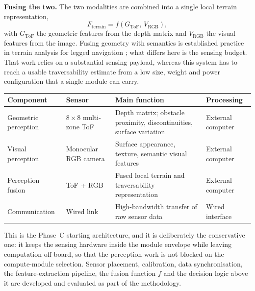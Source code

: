 \documentclass[11pt,a4paper]{article}
\newif\ifreview
\newcommand{\pending}[1]{\ifreview{\color{blue}#1}\else#1\fi}
\newenvironment{pblock}{\ifreview\color{blue}\fi}{}
\newcounter{gsec}
\newcounter{gsub}
\newcommand{\curgsec}{}
\newcommand{\gsep}{\texorpdfstring{\quad}{ }}
\newcommand{\gtocsub}[2]{%
  \phantomsection
  \addcontentsline{toc}{subsection}{#1\gsep #2}%
}
\newcommand{\gsubsection}[1]{%
  \refstepcounter{gsub}%
  \edef\gsublbl{\curgsec.\thegsub}%
  \expandafter\gtocsub\expandafter{\gsublbl}{#1}%
  \subsection*{\gsublbl\quad #1}%
}
\begin{document}
{\noindent\textbf{Fusing the two.} The two modalities are combined into a single
local terrain representation,
\begin{equation}
  F_{\mathrm{terrain}} = f\!\left(G_{\mathrm{ToF}},\, V_{\mathrm{RGB}}\right),
\end{equation}
with $G_{\mathrm{ToF}}$ the geometric features from the depth matrix and
$V_{\mathrm{RGB}}$ the visual features from the image. Fusing geometry with
semantics is established practice in terrain analysis for legged navigation
\cite{haddeler2022}; what differs here is the sensing budget. That work relies
on a substantial sensing payload, whereas this system has to reach a usable
traversability estimate from a low size, weight and power configuration that a
single module can carry.
}

\begin{pblock}
\begin{longtable}{@{}L{0.18\textwidth} L{0.19\textwidth} L{0.35\textwidth}
                    L{0.17\textwidth}@{}}
\toprule
\textbf{Component} & \textbf{Sensor} & \textbf{Main function} &
\textbf{Processing} \\
\midrule
\endhead
Geometric perception & $8\times8$ multi-zone ToF &
  Depth matrix; obstacle proximity, discontinuities, surface variation &
  External computer \\
Visual perception & Monocular RGB camera &
  Surface appearance, texture, semantic visual features &
  External computer \\
Perception fusion & ToF + RGB &
  Fused local terrain and traversability representation &
  External computer \\
Communication & Wired link &
  High-bandwidth transfer of raw sensor data &
  Wired interface \\
\bottomrule
\end{longtable}
\end{pblock}

\pending{%
\noindent This is the Phase~C starting architecture, and it is deliberately the
conservative one: it keeps the sensing hardware inside the module envelope
while leaving computation off-board, so that the perception work is not blocked
on the compute-module selection. Sensor placement, calibration, data
synchronisation, the feature-extraction pipeline, the fusion function $f$ and
the decision logic above it are developed and evaluated as part of the
methodology.
}

\pending{}
\end{document}
